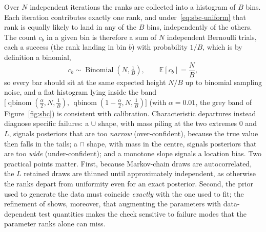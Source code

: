 Over $N$ independent iterations the ranks are collected into a histogram of $B$
bins. Each iteration contributes exactly one rank, and under~\eqref{eq:sbc-uniform}
that rank is equally likely to land in any of the $B$ bins, independently of the
others. The count $c_b$ in a given bin is therefore a sum of $N$ independent
Bernoulli trials, each a success (the rank landing in bin $b$) with probability
$1/B$, which is by definition a binomial,
%
\begin{equation}
  c_b \sim \operatorname{Binomial}\!\left(N, \tfrac{1}{B}\right), \qquad
  \mathbb{E}[c_b] = \frac{N}{B},
  \label{eq:sbc-bins}
\end{equation}
%
so every bar should sit at the same expected height $N/B$ up to binomial sampling
noise, and a flat histogram lying inside the band
$\big[\operatorname{qbinom}(\tfrac{\alpha}{2},N,\tfrac1B),\,
\operatorname{qbinom}(1-\tfrac{\alpha}{2},N,\tfrac1B)\big]$ (with $\alpha=0.01$,
the grey band of Figure~\ref{fig:sbc}) is consistent with calibration.
Characteristic departures instead diagnose specific failures: a $\cup$ shape, with
mass piling at the two extremes $0$ and $L$, signals posteriors that are too
\emph{narrow} (over-confident), because the true value then falls in the tails; a
$\cap$ shape, with mass in the centre, signals posteriors that are too \emph{wide}
(under-confident); and a monotone slope signals a location bias. Two practical
points matter. First, because Markov-chain draws are autocorrelated, the $L$
retained draws are thinned until approximately independent, as otherwise the ranks
depart from uniformity even for an exact posterior. Second, the prior used to
generate the data must coincide \emph{exactly} with the one used to fit; the
refinement of \textcite{modrak2023simulation} shows, moreover, that augmenting the
parameters with data-dependent test quantities makes the check sensitive to
failure modes that the parameter ranks alone can miss.

